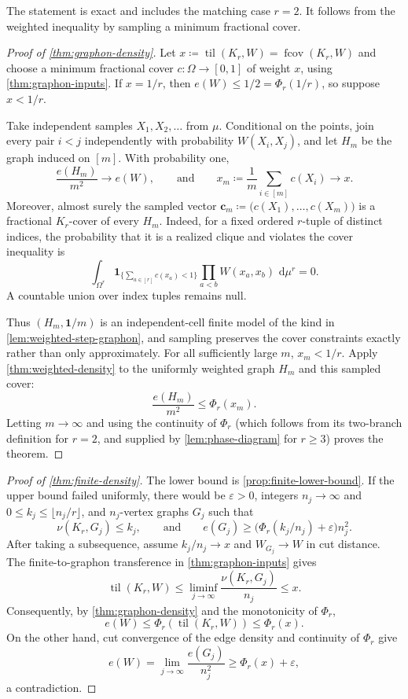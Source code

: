\documentclass[10pt]{article}
\numberwithin{equation}{section}
\newcommand{\til}{\operatorname{til}}
\newcommand{\fcov}{\operatorname{fcov}}
\newcommand{\one}{\mathbf 1}
\newcommand{\vct}[1]{\boldsymbol{#1}}
\newcommand{\eps}{\varepsilon}
\newcommand{\dd}{\,\mathrm d}
\begin{document}
The statement is exact and includes the matching case $r=2$.  It follows from the weighted inequality by sampling a minimum fractional cover.

\begin{proof}[Proof of \cref{thm:graphon-density}]
Let $x\coloneqq\til(K_r,W)=\fcov(K_r,W)$ and choose a minimum fractional cover $c:\Omega\to[0,1]$ of weight $x$, using \cref{thm:graphon-inputs}.  If $x=1/r$, then $e(W)\le1/2=\Phi_r(1/r)$, so suppose $x<1/r$.

Take independent samples $X_1,X_2,\ldots$ from $\mu$.  Conditional on the points, join every pair $i<j$ independently with probability $W(X_i,X_j)$, and let $H_m$ be the graph induced on $[m]$.  With probability one,
\[
 \frac{e(H_m)}{m^2}\longrightarrow e(W),
 \qquad\text{and}\qquad
 x_m\coloneqq\frac1m\sum_{i\in[m]} c(X_i)\longrightarrow x.
\]
Moreover, almost surely the sampled vector $\vct c_m\coloneqq\bigl(c(X_1),\ldots,c(X_m)\bigr)$ is a fractional $K_r$-cover of every $H_m$.  Indeed, for a fixed ordered $r$-tuple of distinct indices, the probability that it is a realized clique and violates the cover inequality is
\[
 \int_{\Omega^r}
 \one_{\{\sum_{a\in[r]}c(x_a)<1\}}
 \prod_{a<b}W(x_a,x_b)\,\dd\mu^r=0.
\]
A countable union over index tuples remains null.

Thus $(H_m,\one/m)$ is an independent-cell finite model of the kind in \cref{lem:weighted-step-graphon}, and sampling preserves the cover constraints exactly rather than only approximately.  For all sufficiently large $m$, $x_m<1/r$.  Apply \cref{thm:weighted-density} to the uniformly weighted graph $H_m$ and this sampled cover:
\[
 \frac{e(H_m)}{m^2}\le \Phi_r(x_m).
\]
Letting $m\to\infty$ and using the continuity of $\Phi_r$ (which follows from its two-branch definition for $r=2$, and supplied by \cref{lem:phase-diagram} for $r\ge3$) proves the theorem.
\end{proof}

\begin{proof}[Proof of \cref{thm:finite-density}]
The lower bound is \cref{prop:finite-lower-bound}.  If the upper bound failed uniformly, there would be $\eps>0$, integers $n_j\to\infty$ and $0\le k_j\le\lfloor n_j/r\rfloor$, and $n_j$-vertex graphs $G_j$ such that
\[
 \nu(K_r,G_j)\le k_j,
 \qquad\text{and}\qquad
 e(G_j)\ge\bigl(\Phi_r(k_j/n_j)+\eps\bigr)n_j^2.
\]
After taking a subsequence, assume $k_j/n_j\to x$ and $W_{G_j}\to W$ in cut distance.  The finite-to-graphon transference in \cref{thm:graphon-inputs} gives
\[
 \til(K_r,W)
 \le\liminf_{j\to\infty}\frac{\nu(K_r,G_j)}{n_j}
 \le x.
\]
Consequently, by \cref{thm:graphon-density} and the monotonicity of $\Phi_r$,
\[
 e(W)\le \Phi_r(\til(K_r,W))\le \Phi_r(x).
\]
On the other hand, cut convergence of the edge density and continuity of $\Phi_r$ give
\[
 e(W)=\lim_{j\to\infty}\frac{e(G_j)}{n_j^2}
 \ge \Phi_r(x)+\eps,
\]
a contradiction.
\end{proof}
\end{document}

